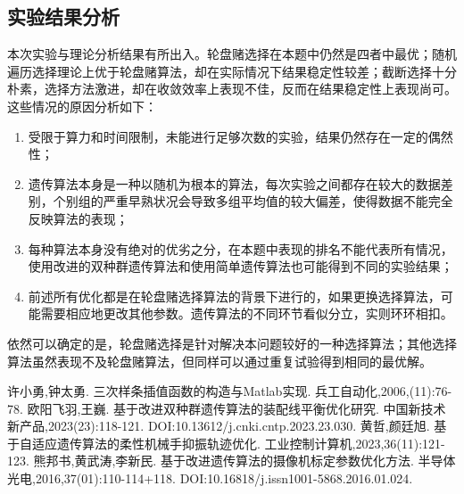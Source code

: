 \documentclass[withoutpreface,bwprint]{cumcmthesis} %
\begin{document}
\subsection{实验结果分析}

本次实验与理论分析结果有所出入。轮盘赌选择在本题中仍然是四者中最优；随机遍历选择理论上优于轮盘赌算法，却在实际情况下结果稳定性较差；截断选择十分朴素，选择方法激进，却在收敛效率上表现不佳，反而在结果稳定性上表现尚可。这些情况的原因分析如下：

\begin{enumerate}
    \item 受限于算力和时间限制，未能进行足够次数的实验，结果仍然存在一定的偶然性；
    \item 遗传算法本身是一种以随机为根本的算法，每次实验之间都存在较大的数据差别，个别组的严重早熟状况会导致多组平均值的较大偏差，使得数据不能完全反映算法的表现；
    \item 每种算法本身没有绝对的优劣之分，在本题中表现的排名不能代表所有情况，使用改进的双种群遗传算法和使用简单遗传算法也可能得到不同的实验结果；
    \item 前述所有优化都是在轮盘赌选择算法的背景下进行的，如果更换选择算法，可能需要相应地更改其他参数。遗传算法的不同环节看似分立，实则环环相扣。
\end{enumerate}

依然可以确定的是，轮盘赌选择是针对解决本问题较好的一种选择算法；其他选择算法虽然表现不及轮盘赌算法，但同样可以通过重复试验得到相同的最优解。


\begin{thebibliography}{9}%
    许小勇,钟太勇.
    \newblock 三次样条插值函数的构造与Matlab实现\allowbreak[J].
    \newblock 兵工自动化,2006,(11):76-78.
    欧阳飞羽,王巍.
    \newblock 基于改进双种群遗传算法的装配线平衡优化研究\allowbreak[J].
    \newblock 中国新技术新产品,2023(23):118-121.
    \newblock DOI:10.13612/j.cnki.cntp.2023.23.030.
    黄哲,颜廷旭.
    \newblock 基于自适应遗传算法的柔性机械手抑振轨迹优化\allowbreak[J].
    \newblock 工业控制计算机,2023,36(11):121-123.
    熊邦书,黄武涛,李新民.
    \newblock 基于改进遗传算法的摄像机标定参数优化方法\allowbreak[J].
    \newblock 半导体光电,2016,37(01):110-114+118.
    \newblock DOI:10.16818/j.issn1001-5868.2016.01.024.
\end{thebibliography}
\end{document}
